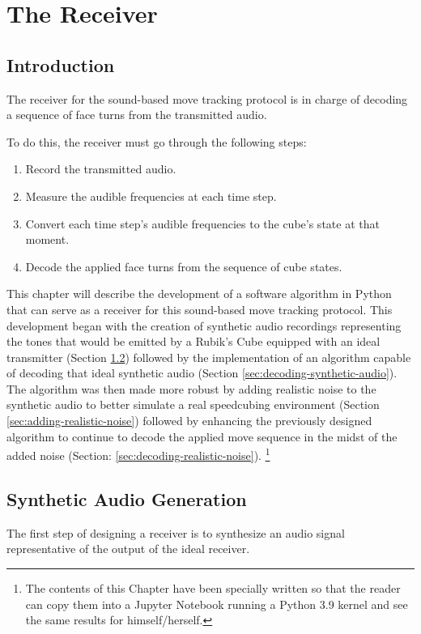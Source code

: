 
\chapter{The Receiver} %

\label{Chapter5}

\section{Introduction}
The receiver for the sound-based move tracking protocol is in charge of decoding a sequence of face turns from the transmitted audio.

To do this, the receiver must go through the following steps:
\begin{enumerate}
    \item Record the transmitted audio.
    \item Measure the audible frequencies at each time step.
    \item Convert each time step's audible frequencies to the cube's state at that moment.
    \item Decode the applied face turns from the sequence of cube states.
\end{enumerate}

This chapter will describe the development of a software algorithm in Python that can serve as a receiver for this sound-based move tracking protocol. 
This development began with the creation of synthetic audio recordings representing the tones that would be emitted by a Rubik's Cube equipped with an ideal transmitter (Section \ref{sec:synthetic-audio-generation}) followed by the implementation of an algorithm capable of decoding that ideal synthetic audio (Section \ref{sec:decoding-synthetic-audio}).
The algorithm was then made more robust by adding realistic noise to the synthetic audio to better simulate a real speedcubing environment (Section \ref{sec:adding-realistic-noise}) followed by enhancing the previously designed algorithm to continue to decode the applied move sequence in the midst of the added noise (Section: \ref{sec:decoding-realistic-noise}). \footnote{The contents of this Chapter have been specially written so that the reader can copy them into a Jupyter Notebook running a Python 3.9 kernel and see the same results for himself/herself.} 


\section{Synthetic Audio Generation}
\label{sec:synthetic-audio-generation}
The first step of designing a receiver is to synthesize an audio signal representative of the output of the ideal receiver.

